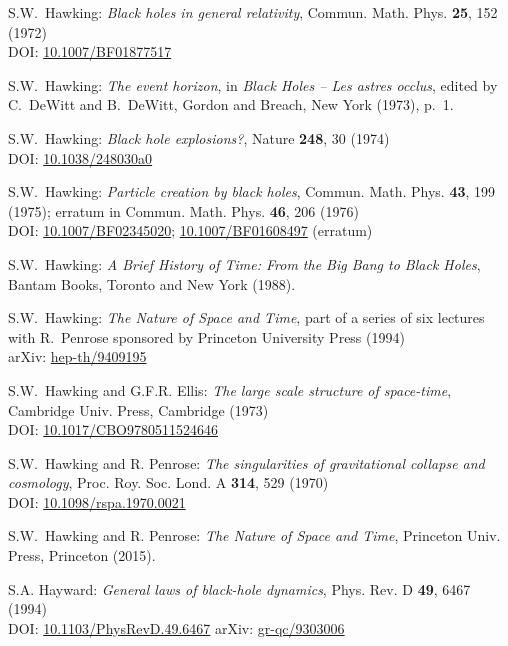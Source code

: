 \begin{thebibliography}{123}
S.W.~Hawking:
{\em Black holes in general relativity},
Commun. Math. Phys. {\bf 25}, 152 (1972)\\
DOI: \href{https://doi.org/10.1007/BF01877517}{10.1007/BF01877517}

S.W.~Hawking:
{\em The event horizon},
in {\em Black Holes -- Les astres occlus}, edited by C.~DeWitt and B.~DeWitt,
Gordon and Breach, New York (1973), p.~1.

S.W.~Hawking: {\em Black hole explosions?},
Nature {\bf 248}, 30 (1974)\\
DOI: \href{https://doi.org/10.1038/248030a0}{10.1038/248030a0}

S.W.~Hawking:
{\em Particle creation by black holes},
Commun. Math. Phys. {\bf 43}, 199 (1975); erratum
in Commun. Math. Phys. {\bf 46}, 206 (1976) \\
DOI: \href{https://doi.org/10.1007/BF02345020}{10.1007/BF02345020};
\href{https://doi.org/10.1007/BF01608497}{10.1007/BF01608497} (erratum)

S.W.~Hawking:
{\em A Brief History of Time: From the Big Bang to Black Holes},
Bantam Books, Toronto and New York (1988).

S.W.~Hawking:
{\em The Nature of Space and Time}, part of a series of six lectures with
R.~Penrose sponsored by Princeton University Press (1994)\\
arXiv: \href{https://arxiv.org/abs/hep-th/9409195}{hep-th/9409195}

S.W.~Hawking and G.F.R. Ellis: {\em The large scale structure of
space-time},
Cambridge Univ. Press, Cambridge (1973)\\
DOI: \href{https://doi.org/10.1017/CBO9780511524646}{10.1017/CBO9780511524646}

S.W.~Hawking and R. Penrose: {\em The singularities of gravitational collapse and cosmology},
Proc. Roy. Soc. Lond. A {\bf 314}, 529 (1970)\\
DOI: \href{https://doi.org/10.1098/rspa.1970.0021}{10.1098/rspa.1970.0021}

S.W.~Hawking and R. Penrose: {\em The Nature of Space and Time},
Princeton Univ. Press, Princeton (2015).

S.A. Hayward:
{\em General laws of black-hole dynamics},
Phys. Rev. D {\bf 49}, 6467 (1994)\\
DOI: \href{https://doi.org/10.1103/PhysRevD.49.6467}{10.1103/PhysRevD.49.6467}\hfill
arXiv: \href{https://arxiv.org/abs/gr-qc/9303006}{gr-qc/9303006}


\end{thebibliography}
